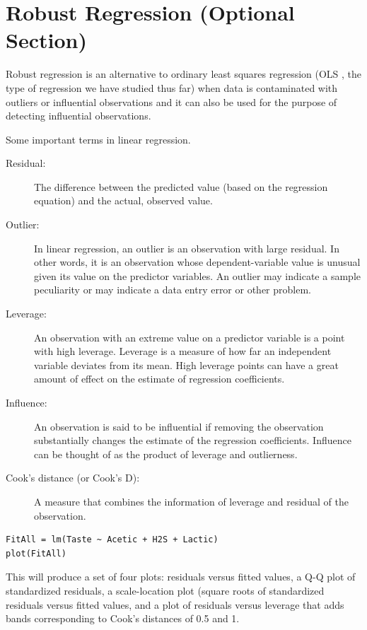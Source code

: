 \documentclass[12pt, a4paper]{article}
\theoremstyle{plain}
\theoremstyle{definition}
\theoremstyle{remark}
\begin{document}
\section{Robust Regression (Optional Section)}

Robust regression is an alternative to ordinary least squares regression (OLS , the type of regression we have studied thus far) when data is contaminated with outliers or influential observations and it can also be used for the purpose of detecting influential observations.

Some important terms in linear regression.
\begin{description}
\item[Residual: ] The difference between the predicted value (based on the regression equation) and the actual, observed value.
\item[Outlier:]  In linear regression, an outlier is an observation with large residual.  In other words, it is an observation whose dependent-variable value is unusual given its value on the predictor variables.  An outlier may indicate a sample peculiarity or may indicate a data entry error or other problem. 
\item[Leverage:]  An observation with an extreme value on a predictor variable is a point with high leverage.  Leverage is a measure of how far an independent variable deviates from its mean.  High leverage points can have a great amount of effect on the estimate of regression coefficients. 
\item[Influence:]  An observation is said to be influential if removing the observation substantially changes the estimate of the regression coefficients.  Influence can be thought of as the product of leverage and outlierness.  
\item[Cook's distance (or Cook's D):] A measure that combines the information of leverage and residual of the observation.  
\end{description}
\begin{framed}
\begin{verbatim}
FitAll = lm(Taste ~ Acetic + H2S + Lactic)
plot(FitAll)
\end{verbatim}
\end{framed}
This will produce a set of four plots: residuals versus fitted values, a Q-Q plot of standardized residuals, a scale-location plot (square roots of standardized residuals versus fitted values, and a plot of residuals versus leverage that adds bands corresponding to Cook's distances of 0.5 and 1. 
\end{document}
